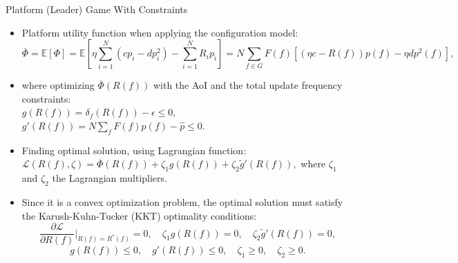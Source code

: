 \documentclass[aspectratio=169,xcolor=dvipsnames]{beamer}
\begin{document}
\begin{frame}[fragile]{Platform (Leader) Game With Constraints}
    \footnotesize %
    \begin{itemize}[<+-| alert@+>]
        \item Platform utility function when applying the configuration model:
             \[
        \overline{\Phi} = \mathbb{E}[\Phi] = \mathbb{E} \left[ \eta \sum_{i=1}^N \left(c p_i - d p_i^2\right) - \sum_{i=1}^N R_i p_i \right] 
        = N \sum_{f \in G} F(f) \left[(\eta c - R(f)) p(f) - \eta d p^2(f)\right],
        \] 
        \item where optimizing \(\overline{\Phi}(R(f))\) with the AoI and the total update frequency constraints:\\
        \(g(R(f)) = \delta_f(R(f)) - \epsilon \leq 0,\) \hspace{0.5cm} \(g'(R(f)) = N \sum_{f} F(f)p(f) - \hat{p} \leq 0.\) \\
        
        \item Finding optimal solution, using Lagrangian function:\\
        \(\mathcal{L}(R(f), \zeta) = \overline{\Phi}(R(f)) + \zeta_1 g(R(f)) + \zeta_2 \tilde{g}'(R(f)),\) where \(\zeta_1\) and \(\zeta_2\) the Lagrangian multipliers.\\
        \vspace{0.3cm}
        \item Since it is a convex optimization problem, the optimal solution must satisfy the Karush-Kuhn-Tucker (KKT) optimality conditions:
        \[
        \frac{\partial \mathcal{L}}{\partial R(f)}\bigg|_{R(f) = R^*(f)} = 0, \quad \zeta_1 g(R(f)) = 0, \quad \zeta_2 \tilde{g}'(R(f)) = 0,
        \]
        \[
        g(R(f)) \leq 0, \quad g'(R(f)) \leq 0, \quad \zeta_1 \geq 0, \quad \zeta_2 \geq 0.
        \]
    \end{itemize} 
\end{frame}
\end{document}
